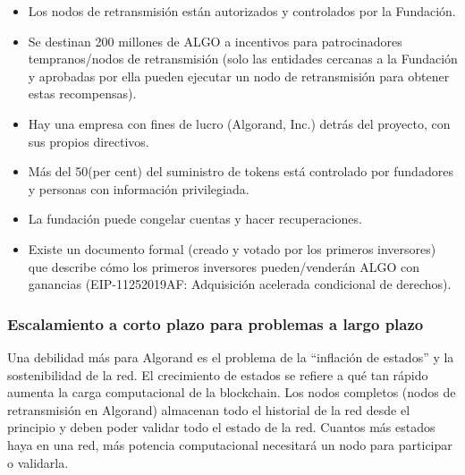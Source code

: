 \documentclass{article}
\begin{document}
\begin{itemize}
    \item Los nodos de retransmisión están autorizados y controlados por la Fundación.
\end{itemize}
\begin{itemize}
    \item Se destinan 200 millones de ALGO a incentivos para patrocinadores tempranos/nodos de retransmisión (solo las entidades cercanas a la Fundación y aprobadas por ella pueden ejecutar un nodo de retransmisión para obtener estas recompensas).
\end{itemize}
\begin{itemize}
    \item Hay una empresa con fines de lucro (Algorand, Inc.) detrás del proyecto, con sus propios directivos.
\end{itemize}
\begin{itemize}
    \item Más del 50(per cent) del suministro de tokens está controlado por fundadores y personas con información privilegiada.
\end{itemize}
\begin{itemize}
    \item La fundación puede congelar cuentas y hacer recuperaciones.
\end{itemize}
\begin{itemize}
    \item Existe un documento formal (creado y votado por los primeros inversores) que describe cómo los primeros inversores pueden/venderán ALGO con ganancias (EIP-11252019AF: Adquisición acelerada condicional de derechos).
\end{itemize}

\subsubsection{Escalamiento a corto plazo para problemas a largo plazo}

Una debilidad más para Algorand es el problema de la “inflación de estados” y la sostenibilidad de la red. El crecimiento de estados se refiere a qué tan rápido aumenta la carga computacional de la blockchain. Los nodos completos (nodos de retransmisión en Algorand) almacenan todo el historial de la red desde el principio y deben poder validar todo el estado de la red. Cuantos más estados haya en una red, más potencia computacional necesitará un nodo para participar o validarla.
\end{document}
